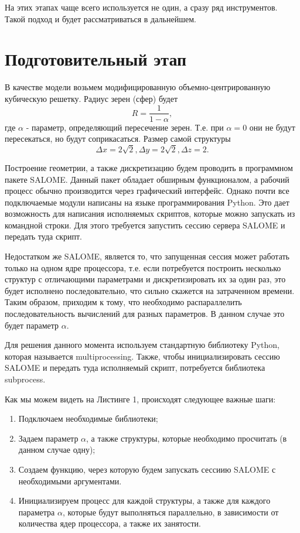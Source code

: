 \documentclass[a4paper, 12pt]{article}
\begin{document}
    На этих этапах чаще всего используется не один, а сразу ряд инструментов. Такой подход и будет рассматриваться в дальнейшем.

    \section{Подготовительный этап}
    В качестве модели возьмем модифицированную объемно-центрированную кубическую решетку. Радиус зерен (сфер) будет
    \[
        R = \frac{1}{1 - \alpha},
    \]
    где $\alpha$ - параметр, определяющий пересечение зерен. Т.е. при $\alpha = 0$ они не будут пересекаться, но будут соприкасаться. Размер самой структуры
    \[
        \Delta x = 2 \sqrt 2, \Delta y = 2 \sqrt 2, \Delta z = 2.
    \]
    
    Построение геометрии, а также дискретизацию будем проводить в программном пакете SALOME. Данный пакет обладает обширным функционалом, а рабочий процесс обычно производится через графический интерфейс. Однако почти все подключаемые модули написаны на языке программирования Python. Это дает возможность для написания исполняемых скриптов, которые можно запускать из командной строки. Для этого требуется запустить сессию сервера SALOME и передать туда скрипт. 
    
    Недостатком же SALOME, является то, что запущенная сессия может работать только на одном ядре процессора, т.е. если потребуется построить несколько структур с отличающими параметрами и дискретизировать их за один раз, это будет исполнено последовательно, что сильно скажется на затраченном времени. Таким образом, приходим к тому, что необходимо распараллелить последовательность вычислений для разных параметров. В данном случае это будет параметр $\alpha$.

    Для решения данного момента используем стандартную библиотеку Python, которая называется multiprocessing. Также, чтобы инициализировать сессию SALOME и передать туда исполняемый скрипт, потребуется библиотека subprocess. 

    

    Как мы можем видеть на Листинге 1, происходят следующее важные шаги:
    \begin{enumerate}
        \item Подключаем необходимые библиотеки;
        \item Задаем параметр $\alpha$, а также структуры, которые необходимо просчитать (в данном случае одну);
        \item Создаем функцию, через которую будем запускать сессиию SALOME с необходимыми аргументами.
        \item Инициализируем процесс для каждой структуры, а также для каждого параметра $\alpha$, которые будут выполняться параллельно, в зависимости от количества ядер процессора, а также их занятости.
    \end{enumerate}
\end{document}
